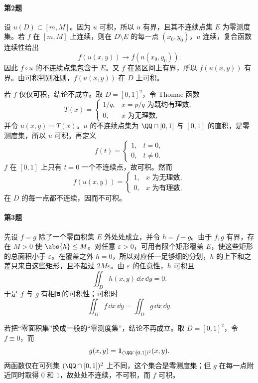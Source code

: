 \paragraph{第2题}
\begin{xsolution}
设 $u(D)\subset[m,M]$。因为 $u$ 可积，所以 $u$ 有界，且其不连续点集 $E$ 为零测度集。若 $f$ 在 $[m,M]$ 上连续，则在 $D\setminus E$ 的每一点 $(x_0,y_0)$，$u$ 连续，复合函数连续性给出
\[
  f(u(x,y))\longrightarrow f(u(x_0,y_0)).
\]
因此 $f\circ u$ 的不连续点集包含于 $E$。又 $f$ 在紧区间上有界，所以 $f(u(x,y))$ 有界。由可积判别准则，$f(u(x,y))$ 在 $D$ 上可积。

若 $f$ 仅仅可积，结论不成立。取 $D=[0,1]^2$，令 Thomae 函数
\[
  T(x)=
  \begin{cases}
    1/q,&x=p/q\text{ 为既约有理数},\\
    0,&x\text{ 为无理数},
  \end{cases}
\]
并令 $u(x,y)=T(x)$。$u$ 的不连续点集为 $\QQ\cap[0,1]$ 与 $[0,1]$ 的直积，是零测度集，所以 $u$ 可积。再定义
\[
  f(t)=
  \begin{cases}
    1,&t=0,\\
    0,&t\ne0.
  \end{cases}
\]
$f$ 在 $[0,1]$ 上只有 $t=0$ 一个不连续点，故可积。然而
\[
  f(u(x,y))=
  \begin{cases}
    1,&x\text{ 为无理数},\\
    0,&x\text{ 为有理数},
  \end{cases}
\]
在 $D$ 的每一点都不连续，因而不可积。
\end{xsolution}

\paragraph{第3题}
\begin{xsolution}
先设 $f=g$ 除了一个零面积集 $E$ 外处处成立，并令 $h=f-g$。由于 $f,g$ 有界，存在 $M>0$ 使 $\abs{h}\le M$。对任意 $\varepsilon>0$，可用有限个矩形覆盖 $E$，使这些矩形的总面积小于 $\varepsilon$。在覆盖之外 $h=0$，所以对应任一足够细的分划，$h$ 的上下和之差只来自这些矩形，且不超过 $2M\varepsilon$。由 $\varepsilon$ 的任意性，$h$ 可积且
\[
  \iint_D h(x,y)\,\dd x\,\dd y=0.
\]
于是 $f$ 与 $g$ 有相同的可积性；可积时
\[
  \iint_Df\,\dd x\,\dd y=\iint_Dg\,\dd x\,\dd y.
\]

若把“零面积集”换成一般的“零测度集”，结论不再成立。取 $D=[0,1]^2$，令 $f\equiv0$，而
\[
  g(x,y)=\mathbf 1_{(\QQ\cap[0,1])^2}(x,y).
\]
两函数仅在可列集 $(\QQ\cap[0,1])^2$ 上不同，这个集合是零测度集；但 $g$ 在每一点附近同时取得 $0$ 和 $1$，故处处不连续，不可积，而 $f$ 可积。
\end{xsolution}

